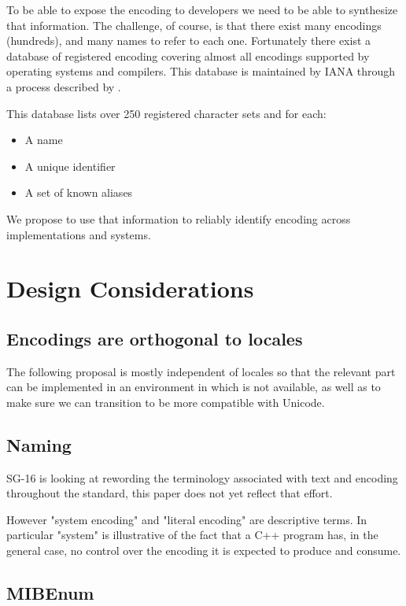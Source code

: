 \documentclass{wg21}
\begin{document}
To be able to expose the encoding to developers we need to be able to synthesize that information.
The challenge, of course, is that there exist many encodings (hundreds), and many names to refer to each one.
Fortunately there exist a database of registered encoding covering almost all encodings supported by operating systems and compilers.
This database is maintained by IANA through a process described by \cite{rfc2978}.

This database lists over 250 registered character sets and for each:
\begin{itemize}
    \item A name
    \item A unique identifier
    \item A set of known aliases
\end{itemize}

We propose to use that information to reliably identify encoding across implementations and systems.


\section{Design Considerations}

\subsection{Encodings are orthogonal to locales}

The following proposal is mostly independent of locales so that the relevant part can be implemented in an environment in which 
is not available, as well as to make sure we can transition  to be more compatible with Unicode.

\subsection{Naming}
SG-16 is looking at rewording the terminology associated with text and encoding throughout the standard, this paper does not yet reflect that effort.

However "system encoding" and "literal encoding" are descriptive terms. In particular "system" is illustrative of the
fact that a C++ program has, in the general case, no control over the encoding it is expected to produce and consume.

\subsection{MIBEnum}
\end{document}
